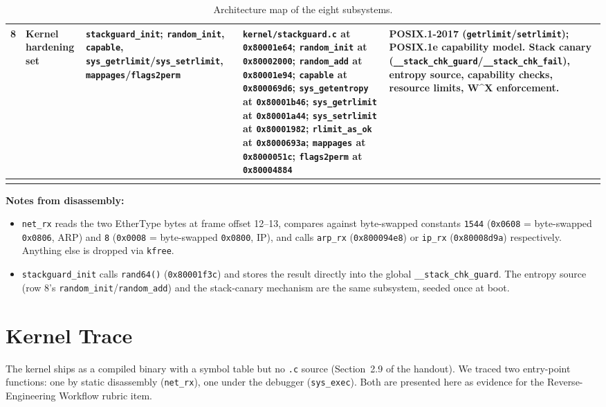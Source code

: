 \documentclass[11pt,a4paper]{article}
\begin{document}
\begin{longtable}{@{}p{0.4cm}p{3.1cm}p{3.2cm}p{3.6cm}p{4.5cm}@{}}
8 & Kernel hardening set & \texttt{stackguard\_init}; \texttt{random\_init}, \texttt{capable}, \texttt{sys\_getrlimit}/\texttt{sys\_setrlimit}, \texttt{mappages}/\texttt{flags2perm} & \texttt{kernel/stackguard.c} at \texttt{0x80001e64}; \texttt{random\_init} at \texttt{0x80002000}; \texttt{random\_add} at \texttt{0x80001e94}; \texttt{capable} at \texttt{0x800069d6}; \texttt{sys\_getentropy} at \texttt{0x80001b46}; \texttt{sys\_getrlimit} at \texttt{0x80001a44}; \texttt{sys\_setrlimit} at \texttt{0x80001982}; \texttt{rlimit\_as\_ok} at \texttt{0x8000693a}; \texttt{mappages} at \texttt{0x8000051c}; \texttt{flags2perm} at \texttt{0x80004884} & POSIX.1-2017 (\texttt{getrlimit}/\texttt{setrlimit}); POSIX.1e capability model. Stack canary (\texttt{\_\_stack\_chk\_guard}/\texttt{\_\_stack\_chk\_fail}), entropy source, capability checks, resource limits, W\^{}X enforcement. \\
\bottomrule
\caption{Architecture map of the eight subsystems.}
\end{longtable}

\textbf{Notes from disassembly:}
\begin{itemize}[leftmargin=*]
\item \texttt{net\_rx} reads the two EtherType bytes at frame offset 12--13, compares against byte-swapped constants \texttt{1544} (\texttt{0x0608} = byte-swapped \texttt{0x0806}, ARP) and \texttt{8} (\texttt{0x0008} = byte-swapped \texttt{0x0800}, IP), and calls \texttt{arp\_rx} (\texttt{0x800094e8}) or \texttt{ip\_rx} (\texttt{0x80008d9a}) respectively. Anything else is dropped via \texttt{kfree}.
\item \texttt{stackguard\_init} calls \texttt{rand64()} (\texttt{0x80001f3c}) and stores the result directly into the global \texttt{\_\_stack\_chk\_guard}. The entropy source (row 8's \texttt{random\_init}/\texttt{random\_add}) and the stack-canary mechanism are the same subsystem, seeded once at boot.
\end{itemize}

\section{Kernel Trace}

The kernel ships as a compiled binary with a symbol table but no \texttt{.c} source (Section~2.9 of the handout). We traced two entry-point functions: one by static disassembly (\texttt{net\_rx}), one under the debugger (\texttt{sys\_exec}). Both are presented here as evidence for the Reverse-Engineering Workflow rubric item.
\end{document}
